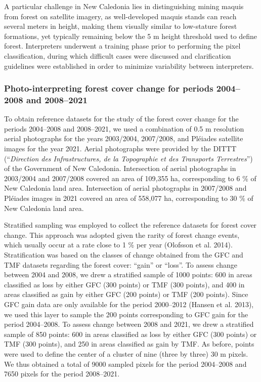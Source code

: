 \documentclass[paper=a4, fontsize=12pt, DIV=13, english, dvipsnames]{scrartcl}
\makeatletter
\newcommand{\cslcitation}[2]
 {\protect\hyper@linkstart{cite}{citeproc_bib_item_#1}#2\hyper@linkend}
\makeatother
\begin{document}
A particular challenge in New Caledonia lies in distinguishing mining maquis from forest on satellite imagery, as well-developed maquis stands can reach several meters in height, making them visually similar to low-stature forest formations, yet typically remaining below the 5 m height threshold used to define forest. Interpreters underwent a training phase prior to performing the pixel classification, during which difficult cases were discussed and clarification guidelines were established in order to minimize variability between interpreters.
\subsubsection{Photo-interpreting forest cover change for periods 2004--2008 and 2008--2021}
\label{sec:orgb9f651f}
To obtain reference datasets for the study of the forest cover change for the periods 2004--2008 and 2008--2021, we used a combination of 0.5 m resolution aerial photographs for the years 2003/2004, 2007/2008, and Pléiades satellite images for the year 2021. Aerial photographs were provided by the DITTT (``\emph{Direction des Infrastructures, de la Topographie et des Transports Terrestres}'') of the Government of New Caledonia. Intersection of aerial photographs in 2003/2004 and 2007/2008 covered an area of 109,355 ha, corresponding to 6 \% of New Caledonia land area. Intersection of aerial photographs in 2007/2008 and Pléiades images in 2021 covered an area of 558,077 ha, corresponding to 30 \% of New Caledonia land area.

Stratified sampling was employed to collect the reference datasets for forest cover change. This approach was adopted given the rarity of forest change events, which usually occur at a rate close to 1 \% per year (\cslcitation{9}{Olofsson et al. 2014}). Stratification was based on the classes of change obtained from the GFC and TMF datasets regarding the forest cover: ``gain'' or ``loss''. To assess change between 2004 and 2008, we drew a stratified sample of 1000 points: 600 in areas classified as loss by either GFC (300 points) or TMF (300 points), and 400 in areas classified as gain by either GFC (200 points) or TMF (200 points). Since GFC gain data are only available for the period 2000--2012 (\cslcitation{6}{Hansen et al. 2013}), we used this layer to sample the 200 points corresponding to GFC gain for the period 2004--2008. To assess change between 2008 and 2021, we drew a stratified sample of 850 points: 600 in areas classified as loss by either GFC (300 points) or TMF (300 points), and 250 in areas classified as gain by TMF. As before, points were used to define the center of a cluster of nine (three by three) 30 m pixels. We thus obtained a total of 9000 sampled pixels for the period 2004--2008 and 7650 pixels for the period 2008--2021.
\end{document}

